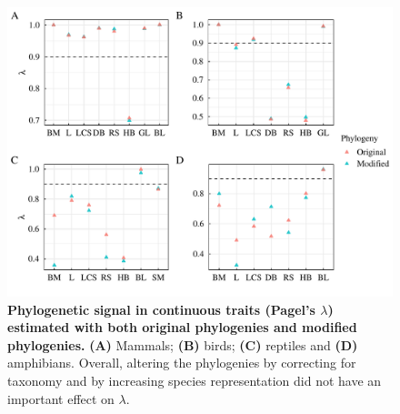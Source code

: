 \begin{figure}[h!]
\centering
\includegraphics[scale=0.5]{figures/chapter2/Phylosignal/Continuous}
\caption[Phylogenetic signal in continuous traits (Pagel's $\lambda$) estimated with both original phylogenies and modified phylogenies]{\textbf{Phylogenetic signal in continuous traits (Pagel's $\lambda$) estimated with both original phylogenies and modified phylogenies.} \textbf{(A)} Mammals; \textbf{(B)} birds; \textbf{(C)} reptiles and \textbf{(D)} amphibians. Overall, altering the phylogenies by correcting for taxonomy and by increasing species representation did not have an important effect on $\lambda$.}
\label{signalcontinuous}
\end{figure}

